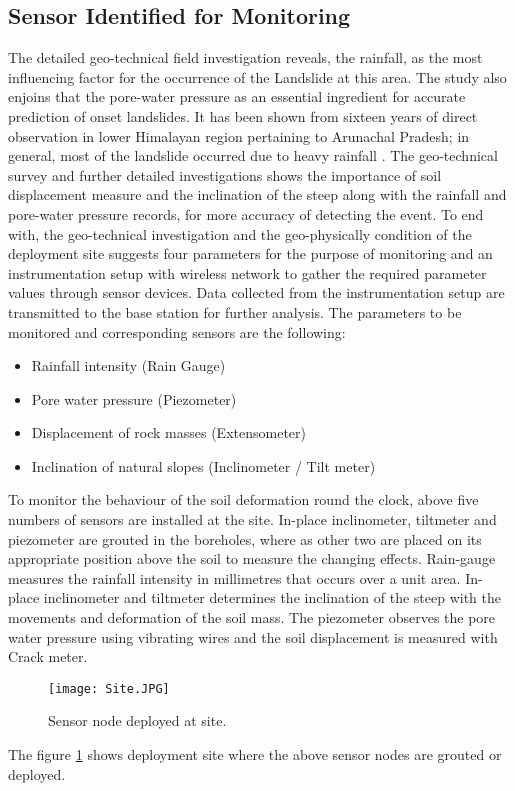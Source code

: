 \documentclass[conference]{IEEEtran}
\begin{document}
\subsection{Sensor Identified for Monitoring}
The detailed geo-technical field investigation reveals, the rainfall, as the most influencing factor for the occurrence of
the Landslide at this area. The study also enjoins that the pore-water pressure as an essential ingredient for accurate
prediction of onset landslides. It has been shown from sixteen years of direct observation in lower Himalayan region pertaining to Arunachal Pradesh; in general, most of the landslide occurred due to heavy rainfall \cite{jotisankasa}. The geo-technical survey and further detailed investigations shows the importance of soil displacement measure and the inclination of the steep along with the rainfall and pore-water pressure records, for more accuracy of detecting the event. To end with, the geo-technical investigation and the geo-physically condition of the deployment site suggests four parameters for the purpose of monitoring and an instrumentation setup with wireless network to gather the required parameter values through sensor devices. Data collected from the instrumentation setup are transmitted to the base station for further analysis. The parameters to be monitored and corresponding sensors are the following:
\begin{itemize}
  \item Rainfall intensity (Rain Gauge)
  \item Pore water pressure (Piezometer)
  \item Displacement of rock masses (Extensometer)
  \item Inclination of natural slopes (Inclinometer / Tilt meter)
\end{itemize}
To monitor the behaviour of the soil deformation round the clock, above five numbers of sensors are installed at the site.
In-place inclinometer, tiltmeter and piezometer are grouted in the boreholes, where as other two are placed on its appropriate position above the soil to measure the changing effects. Rain-gauge measures the rainfall intensity in millimetres that occurs over a unit area. In-place inclinometer and tiltmeter determines the inclination of the steep with the movements and deformation of the soil mass. The piezometer observes the pore water pressure using vibrating wires and the soil displacement is measured with Crack meter.
\begin{figure}[h!]
    \centering
    \texttt{[image: Site.JPG]}
\caption{Sensor node deployed at site.}
  \label{fig:sensite}
\end{figure}
\par
The figure \ref{fig:sensite} shows deployment site where the above sensor
nodes are grouted or deployed.
\end{document}
